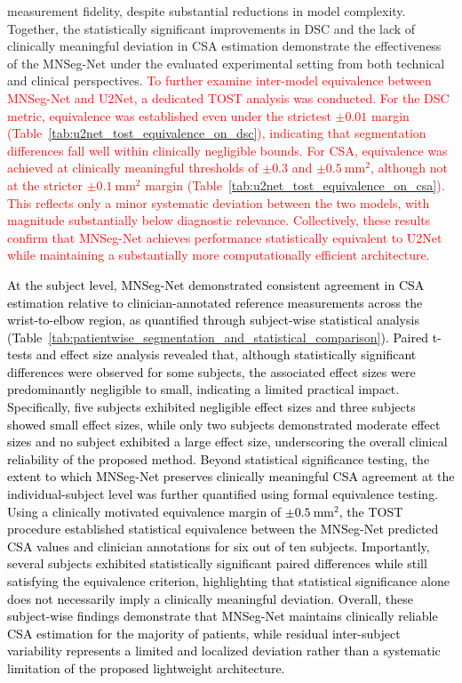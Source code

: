 measurement fidelity, despite substantial reductions in model complexity. Together, the statistically significant improvements in DSC and the lack of clinically meaningful deviation in CSA estimation demonstrate the effectiveness of the MNSeg-Net under the evaluated experimental setting from both technical and clinical perspectives. \textcolor{red}{To further examine inter-model equivalence between MNSeg-Net and U2Net, a dedicated TOST analysis was conducted. For the DSC metric, equivalence was established even under the strictest $\pm 0.01$ margin (Table~\ref{tab:u2net_tost_equivalence_on_dsc}), indicating that segmentation differences fall well within clinically negligible bounds. For CSA, equivalence was achieved at clinically meaningful thresholds of $\pm 0.3$ and $\pm 0.5~\mathrm{mm}^2$, although not at the stricter $\pm 0.1~\mathrm{mm}^2$ margin (Table~\ref{tab:u2net_tost_equivalence_on_csa}). This reflects only a minor systematic deviation between the two models, with magnitude substantially below diagnostic relevance. Collectively, these results confirm that MNSeg-Net achieves performance statistically equivalent to U2Net while maintaining a substantially more computationally efficient architecture.}


\textcolor{black}{At the subject level, MNSeg-Net demonstrated consistent agreement in CSA estimation relative to clinician-annotated reference measurements across the wrist-to-elbow region, as quantified through subject-wise statistical analysis (Table~\ref{tab:patientwise_segmentation_and_statistical_comparison}). Paired t-tests and effect size analysis revealed that, although statistically significant differences were observed for some subjects, the associated effect sizes were predominantly negligible to small, indicating a limited practical impact. Specifically, five subjects exhibited negligible effect sizes and three subjects showed small effect sizes, while only two subjects demonstrated moderate effect sizes and no subject exhibited a large effect size, underscoring the overall clinical reliability of the proposed method. Beyond statistical significance testing, the extent to which MNSeg-Net preserves clinically meaningful CSA agreement at the individual-subject level was further quantified using formal equivalence testing. Using a clinically motivated equivalence margin of $\pm 0.5~\mathrm{mm}^2$, the TOST procedure established statistical equivalence between the MNSeg-Net predicted CSA values and clinician annotations for six out of ten subjects. Importantly, several subjects exhibited statistically significant paired differences while still satisfying the equivalence criterion, highlighting that statistical significance alone does not necessarily imply a clinically meaningful deviation. Overall, these subject-wise findings demonstrate that MNSeg-Net maintains clinically reliable CSA estimation for the majority of patients, while residual inter-subject variability represents a limited and localized deviation rather than a systematic limitation of the proposed lightweight architecture. }










